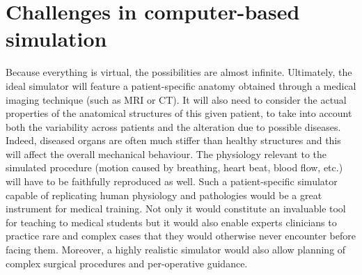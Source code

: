 \section{Challenges in computer-based simulation}

Because everything is virtual, the possibilities are almost infinite. Ultimately, the ideal simulator will feature a patient-specific anatomy obtained through a medical imaging technique (such as MRI or CT). It will also need to consider the actual properties of the anatomical structures of this given patient, to take into account both the variability across patients and the alteration due to possible diseases. Indeed, diseased organs are often much stiffer than healthy structures and this will affect the overall mechanical behaviour. The physiology relevant to the simulated procedure (motion caused by breathing, heart beat, blood flow, etc.) will have to be faithfully reproduced as well. Such a patient-specific simulator capable of replicating human physiology and pathologies would be a great instrument for medical training. Not only it would constitute an invaluable tool for teaching to medical students but it would also enable experts clinicians to practice rare and complex cases that they would otherwise never encounter before facing them. Moreover, a highly realistic simulator would also allow planning of complex surgical procedures and per-operative guidance.

